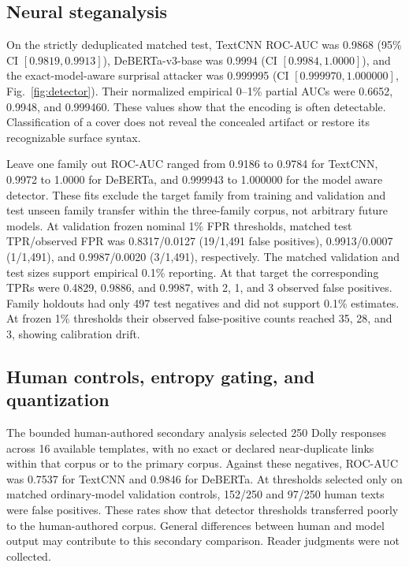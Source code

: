 \documentclass[fleqn,10pt]{wlscirep}
\begin{document}
\subsection*{Neural steganalysis}\label{sec:results-detector}

On the strictly deduplicated matched test, TextCNN ROC-AUC was 0.9868 (95\% CI \([0.9819,0.9913]\)), DeBERTa-v3-base was 0.9994 (CI \([0.9984,1.0000]\)), and the exact-model-aware surprisal attacker was 0.999995 (CI \([0.999970,1.000000]\), Fig.~\ref{fig:detector}). Their normalized empirical 0--1\% partial AUCs were 0.6652, 0.9948, and 0.999460. These values show that the encoding is often detectable. Classification of a cover does not reveal the concealed artifact or restore its recognizable surface syntax.

Leave one family out ROC-AUC ranged from 0.9186 to 0.9784 for TextCNN, 0.9972 to 1.0000 for DeBERTa, and 0.999943 to 1.000000 for the model aware detector. These fits exclude the target family from training and validation and test unseen family transfer within the three-family corpus, not arbitrary future models. At validation frozen nominal 1\% FPR thresholds, matched test TPR/observed FPR was 0.8317/0.0127 (19/1,491 false positives), 0.9913/0.0007 (1/1,491), and 0.9987/0.0020 (3/1,491), respectively. The matched validation and test sizes support empirical 0.1\% reporting. At that target the corresponding TPRs were 0.4829, 0.9886, and 0.9987, with 2, 1, and 3 observed false positives. Family holdouts had only 497 test negatives and did not support 0.1\% estimates. At frozen 1\% thresholds their observed false-positive counts reached 35, 28, and 3, showing calibration drift.



\subsection*{Human controls, entropy gating, and quantization}\label{sec:results-v3}

The bounded human-authored secondary analysis selected 250 Dolly responses across 16 available templates, with no exact or declared near-duplicate links within that corpus or to the primary corpus. Against these negatives, ROC-AUC was 0.7537 for TextCNN and 0.9846 for DeBERTa. At thresholds selected only on matched ordinary-model validation controls, 152/250 and 97/250 human texts were false positives. These rates show that detector thresholds transferred poorly to the human-authored corpus. General differences between human and model output may contribute to this secondary comparison. Reader judgments were not collected.
\end{document}
